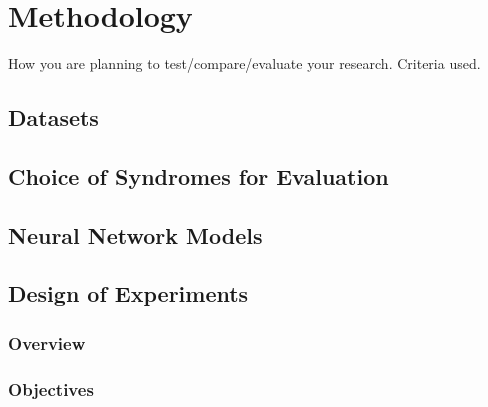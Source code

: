 \documentclass[../report.tex]{subfiles}
\begin{document}
    \chapter{Methodology}

    How you are planning to test/compare/evaluate your research.
    Criteria used.

    \section{Datasets}
    \section{Choice of Syndromes for Evaluation}
    \section{Neural Network Models}
    \section{Design of Experiments}
    \subsection{Overview}
    \subsection{Objectives}
\end{document}
